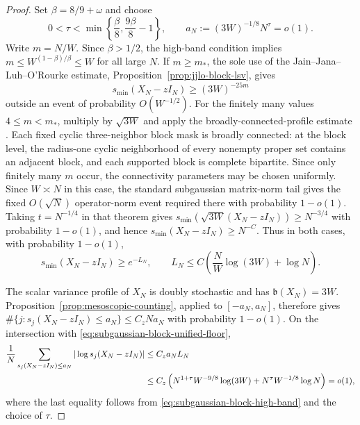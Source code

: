 \documentclass[11pt,reqno]{amsart}
\numberwithin{equation}{section}
\theoremstyle{definition}
\theoremstyle{remark}
\newcommand{\1}{\mathbf 1}
\begin{document}
\begin{proof}
Set $\beta=8/9+\omega$ and choose
\begin{equation}
 0<\tau<\min\left\{\frac\beta8,\frac{9\beta}{8}-1\right\},
 \qquad a_N:=(3W)^{-1/8}N^\tau=o(1).
 \label{eq:subgaussian-block-cutoff}
\end{equation}
Write $m=N/W$.  Since $\beta>1/2$, the high-band condition implies
$m\le W^{(1-\beta)/\beta}\le W$ for all large $N$.  If $m\ge m_*$, the sole use of the
Jain--Jana--Luh--O'Rourke estimate,
Proposition~\ref{prop:jjlo-block-lsv}, gives
\begin{equation}
 s_{\min}(X_N-zI_N)\ge (3W)^{-25m}
 \label{eq:subgaussian-block-floor}
\end{equation}
outside an event of probability $O(W^{-1/2})$.  For the finitely many
values $4\le m<m_*$, multiply by $\sqrt{3W}$ and apply the
broadly-connected-profile estimate \cite[Theorem~1.12]{Cook}.  Each fixed
cyclic three-neighbor block mask is broadly connected: at the block
level, the radius-one cyclic neighborhood of every nonempty proper set
contains an adjacent block, and each supported block is complete
bipartite.  Since only finitely many $m$ occur, the connectivity
parameters may be chosen uniformly.  Since \(W\asymp N\) in this case,
the standard subgaussian matrix-norm tail
\cite[Theorem~4.4.5]{vershynin2019high} gives the fixed
\(O(\sqrt N)\) operator-norm event required there with probability
\(1-o(1)\).
Taking $t=N^{-1/4}$ in that theorem gives
$s_{\min}(\sqrt{3W}(X_N-zI_N))\ge N^{-3/4}$ with probability
$1-o(1)$, and hence $s_{\min}(X_N-zI_N)\ge N^{-C}$.
Thus in both
cases, with probability $1-o(1)$,
\begin{equation}
 s_{\min}(X_N-zI_N)\ge e^{-L_N},
 \qquad
 L_N\le C\left(\frac NW\log(3W)+\log N\right).
 \label{eq:subgaussian-block-unified-floor}
\end{equation}

The scalar variance profile of $X_N$ is doubly stochastic and has
$\mathfrak b(X_N)=3W$.  Proposition~\ref{prop:mesoscopic-counting},
applied to $[-a_N,a_N]$, therefore gives
\(\#\{j:s_j(X_N-zI_N)\le a_N\}\le C_zN a_N\) with probability
$1-o(1)$.  On the intersection with
\eqref{eq:subgaussian-block-unified-floor},
\begin{align}
 \frac1N\sum_{s_j(X_N-zI_N)\le a_N}|\log s_j(X_N-zI_N)|
 &\le C_za_NL_N \notag\\
 &\le C_z\left(N^{1+\tau}W^{-9/8}\log(3W)
       +N^\tau W^{-1/8}\log N\right)=o(1),
 \label{eq:subgaussian-block-hard-edge}
\end{align}
where the last equality follows from \eqref{eq:subgaussian-block-high-band}
and the choice of $\tau$.


\end{proof}
\end{document}
